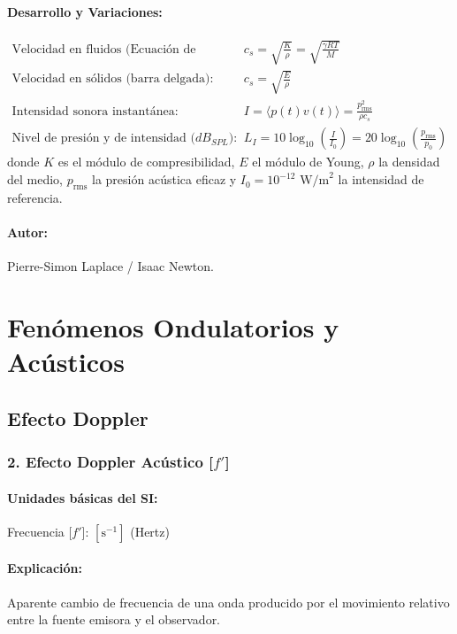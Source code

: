 \documentclass[12pt,a4paper]{article}
\begin{document}
\paragraph*{Desarrollo y Variaciones:}
\begin{align*}
\text{Velocidad en fluidos (Ecuación de Laplace):} \quad & c_s = \sqrt{\frac{K}{\rho}} = \sqrt{\frac{\gamma R T}{M}} \\
\text{Velocidad en sólidos (barra delgada):} \quad & c_s = \sqrt{\frac{E}{\rho}} \\
\text{Intensidad sonora instantánea:} \quad & I = \langle p(t) v(t) \rangle = \frac{p_{\text{rms}}^2}{\rho c_s} \\
\text{Nivel de presión y de intensidad ($dB_{SPL}$):} \quad & L_I = 10 \log_{10} \left( \frac{I}{I_0} \right) = 20 \log_{10} \left( \frac{p_{\text{rms}}}{p_0} \right)
\end{align*}
donde $K$ es el módulo de compresibilidad, $E$ el módulo de Young, $\rho$ la densidad del medio, $p_{\text{rms}}$ la presión acústica eficaz y $I_0 = 10^{-12} \text{ W/m}^2$ la intensidad de referencia.
\paragraph*{Autor:} Pierre-Simon Laplace / Isaac Newton.

\section{Fenómenos Ondulatorios y Acústicos}

\subsection{Efecto Doppler}

\subsubsection*{2. Efecto Doppler Acústico [$f'$]}
\paragraph*{Unidades básicas del SI:} Frecuencia [$f'$]: $[\text{s}^{-1}]$ (Hertz)
\paragraph*{Explicación:} Aparente cambio de frecuencia de una onda producido por el movimiento relativo entre la fuente emisora y el observador.
\end{document}
